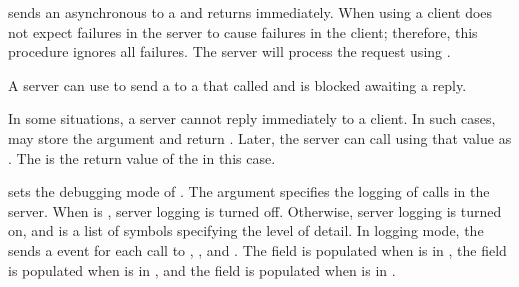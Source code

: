 \begin{argtbl}
\end{argtbl}

 sends an asynchronous  to a
 and returns  immediately. When using
 a client does not expect failures in the
server to cause failures in the client; therefore, this procedure
ignores all failures. The server will process the request using
.

\begin{procedure}
\end{procedure}
\returns{}

\begin{argtbl}
\end{argtbl}

A server can use  to send a
 to a  that called 
and is blocked awaiting a reply.

In some situations, a server cannot reply immediately to a client.
In such cases,  may store the  argument
and return . Later, the server can call
 using that  value as
. The  is the return value of the
 in this case.

\begin{procedure}
\end{procedure}
\returns{} 

\begin{argtbl}
\end{argtbl}

 sets the debugging mode of .
The  argument specifies the logging of calls in
the server. When  is , server logging
is turned off. Otherwise, server logging is turned on, and
 is a list of symbols specifying the level of
detail.  In logging mode, the  sends a
 event for each call to
, , and
. The  field is populated when
 is in , the  field is
populated when  is in , and the
 field is populated when  is in
.

